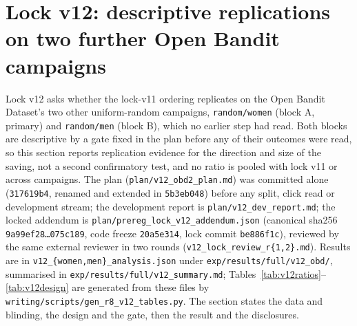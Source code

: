 \documentclass[sigconf,anonymous,review]{acmart}
\begin{document}
\section{Lock v12: descriptive replications on two further Open Bandit campaigns}\label{app:v12}

Lock v12 asks whether the lock-v11 ordering replicates on the Open Bandit Dataset's two other uniform-random campaigns, \texttt{random/women} (block A, primary) and \texttt{random/men} (block B), which no earlier step had read. Both blocks are descriptive by a gate fixed in the plan before any of their outcomes were read, so this section reports replication evidence for the direction and size of the saving, not a second confirmatory test, and no ratio is pooled with lock v11 or across campaigns. The plan (\texttt{plan/v12\_obd2\_plan.md}) was committed alone (\texttt{317619b4}, renamed and extended in \texttt{5b3eb048}) before any split, click read or development stream; the development report is \texttt{plan/v12\_dev\_report.md}; the locked addendum is \texttt{plan/prereg\_lock\_v12\_addendum.json} (canonical sha256 \texttt{9a99ef28\ldots 075c189}, code freeze \texttt{20a5e314}, lock commit \texttt{be886f1c}), reviewed by the same external reviewer in two rounds (\texttt{v12\_lock\_review\_r\{1,2\}.md}). Results are in \texttt{v12\_\{women,men\}\_analysis.json} under \texttt{exp/results/full/v12\_obd/}, summarised in \texttt{exp/results/full/v12\_summary.md}; Tables~\ref{tab:v12ratios}--\ref{tab:v12design} are generated from these files by \texttt{writing/scripts/gen\_r8\_v12\_tables.py}. The section states the data and blinding, the design and the gate, then the result and the disclosures.




\end{document}
